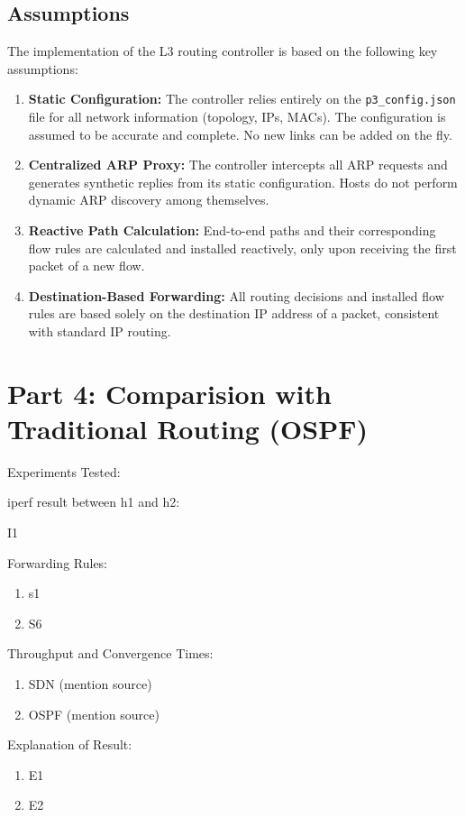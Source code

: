 \documentclass[12pt]{article}
\begin{document}
\subsection{Assumptions}
The implementation of the L3 routing controller is based on the following key assumptions:
\begin{enumerate}
    \item \textbf{Static Configuration:} The controller relies entirely on the \texttt{p3\_config.json} file for all network information (topology, IPs, MACs). The configuration is assumed to be accurate and complete. No new links can be added on the fly.

    \item \textbf{Centralized ARP Proxy:} The controller intercepts all ARP requests and generates synthetic replies from its static configuration. Hosts do not perform dynamic ARP discovery among themselves.

    \item \textbf{Reactive Path Calculation:} End-to-end paths and their corresponding flow rules are calculated and installed reactively, only upon receiving the first packet of a new flow.

    \item \textbf{Destination-Based Forwarding:} All routing decisions and installed flow rules are based solely on the destination IP address of a packet, consistent with standard IP routing.
\end{enumerate}



\section{Part 4: Comparision with Traditional Routing (OSPF)}

Experiments Tested:

iperf result between h1 and h2:

I1

Forwarding Rules:
\begin{enumerate}
    \item s1
    \item S6
\end{enumerate}

Throughput and Convergence Times:
\begin{enumerate}
    \item SDN (mention source)
    \item OSPF (mention source)
\end{enumerate}

Explanation of Result:
\begin{enumerate}
    \item E1 
    \item E2
\end{enumerate}

\end{document}
